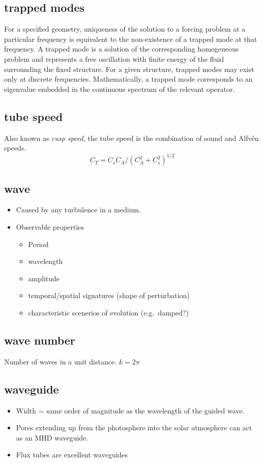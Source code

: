 \documentclass{article}
\begin{document}
\subsection{trapped modes}
For a specified geometry, uniqueness of the solution to a forcing problem
at a particular frequency is equivalent to the non-existence of a trapped
mode at that frequency. A trapped mode is a solution of the corresponding
homogeneous problem and represents a free oscillation with finite energy
of the fluid surrounding the fixed structure. For a given structure,
trapped modes may exist only at discrete frequencies.
Mathematically, a trapped mode corresponds to an eigenvalue embedded
in the continuous spectrum of the relevant operator.

\subsection{tube speed}
Also known as \emph{cusp speed}, the tube speed is the combination of sound
and Alfv\'en speeds.
$${ C_{T} = C_{s}C_{A}/\left(C_{A}^{2} + C_{s}^{2}\right)^{1/2} }$$

\subsection{wave}
\begin{itemize}
    \item Caused by any turbulence in a medium.
    \item Observable properties
        \begin{itemize}
            \item Period
            \item wavelength
            \item amplitude
            \item temporal/spatial signatures (shape of perturbation)
            \item characteristic scenerios of evolution (e.g.\ damped?)
        \end{itemize}
\end{itemize}

\subsection{wave number}
Number of waves in a unit distance.
${ k = 2\pi }$

\subsection{waveguide}
\begin{itemize}
    \item Width $\sim$ same order of magnitude as the wavelength of
        the guided wave.
    \item Pores extending up from the photosphere
        into the solar atmosphere can act as an
        MHD waveguide.
    \item Flux tubes are excellent waveguides
\end{itemize}
\end{document}
